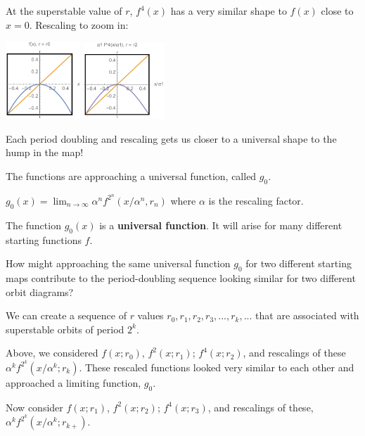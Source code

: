 \documentclass[12pt,letterpaper,noanswers]{exam}
\begin{document}
\begin{questions}
\begin{parts}
\item 
At the superstable value of $r$, $f^4(x)$ has a very similar shape to $f(x)$ close to $x = 0$.  Rescaling to zoom in:

\includegraphics[width=0.21\textwidth]{img/191113-C29p2A.pdf}
\includegraphics[width=0.23\textwidth]{img/191113-C29p3b.pdf}

Each period doubling and rescaling gets us closer to a universal shape to the hump in the map!

The functions are approaching a universal function, called $g_0$.


$g_0(x) = \lim_{n\rightarrow\infty} \alpha^nf^{2^n}\left(x/\alpha^n,r_n\right)$ where $\alpha$ is the rescaling factor.

The function $g_0(x)$ is a \textbf{universal function}.  It will arise for many different starting functions $f$.

How might approaching the same universal function $g_0$ for two different starting maps contribute to the period-doubling sequence looking similar for two different orbit diagrams?


\end{parts}

\question We can create a sequence of $r$ values $r_0, r_1, r_2, r_3, ..., r_k, ...$ that are associated with superstable orbits of period $2^k$.

\begin{parts}
\item Above, we considered $f(x; r_0)$, $f^2(x; r_1)$; $f^4(x; r_2)$, and rescalings of these $\alpha^k f^{2^k}(x/\alpha^k; r_k)$.  These rescaled functions looked very similar to each other and approached a limiting function, $g_0$.

Now consider $f(x; r_1)$, $f^2(x; r_2)$; $f^4(x; r_3)$, and rescalings of these, $\alpha^k f^{2^k}(x/\alpha^k; r_{k+})$.


\end{parts}
\end{questions}
\end{document}
